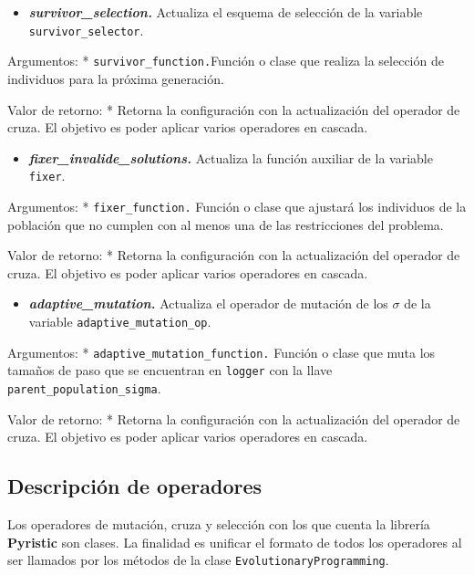 \documentclass[11pt]{article}
\providecommand{\tightlist}{%
      \setlength{\itemsep}{0pt}\setlength{\parskip}{0pt}}
\begin{document}
\begin{itemize}
\tightlist
\item
  \emph{\textbf{survivor\_selection.}} Actualiza el esquema de selección
  de la variable \texttt{survivor\_selector}.
\end{itemize}

Argumentos: * \texttt{survivor\_function.}Función o clase que realiza la
selección de individuos para la próxima generación.

Valor de retorno: * Retorna la configuración con la actualización del
operador de cruza. El objetivo es poder aplicar varios operadores en
cascada.

\begin{itemize}
\tightlist
\item
  \emph{\textbf{fixer\_invalide\_solutions.}} Actualiza la función
  auxiliar de la variable \texttt{fixer}.
\end{itemize}

Argumentos: * \texttt{fixer\_function.} Función o clase que ajustará los
individuos de la población que no cumplen con al menos una de las
restricciones del problema.

Valor de retorno: * Retorna la configuración con la actualización del
operador de cruza. El objetivo es poder aplicar varios operadores en
cascada.

\begin{itemize}
\tightlist
\item
  \emph{\textbf{adaptive\_mutation.}} Actualiza el operador de mutación
  de los \(\sigma\) de la variable \texttt{adaptive\_mutation\_op}.
\end{itemize}

Argumentos: * \texttt{adaptive\_mutation\_function.} Función o clase que
muta los tamaños de paso que se encuentran en \texttt{logger} con la
llave \texttt{parent\_population\_sigma}.

Valor de retorno: * Retorna la configuración con la actualización del
operador de cruza. El objetivo es poder aplicar varios operadores en
cascada.

    \subsection{Descripción de
operadores}\label{descripciuxf3n-de-operadores}

Los operadores de mutación, cruza y selección con los que cuenta la
librería \textbf{Pyristic} son clases. La finalidad es unificar el
formato de todos los operadores al ser llamados por los métodos de la
clase \texttt{EvolutionaryProgramming}.
\end{document}
